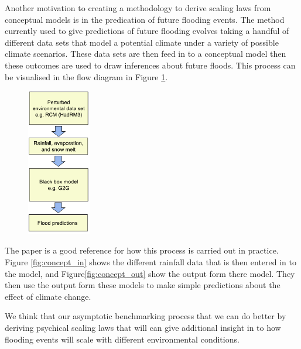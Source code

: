 \documentclass[11pt]{article}
\begin{document}
\begin{minipage}{0.35\textwidth}
    Another motivation to creating a methodology to derive scaling laws from conceptual models is in the predication of future flooding events. 
    The method currently used to give predictions of future flooding evolves taking a handful of different data sets that model a potential climate under a variety of possible climate scenarios. These data sets are then feed in to a conceptual model then these outcomes are used to draw inferences about future floods.
    This process can be visualised in the flow diagram in Figure \ref{fig:flow}.
\end{minipage}
\hspace{0.05\textwidth}
\begin{minipage}{0.55\textwidth}
    \begin{figure}[H]
    \centering
    \includegraphics[width=0.25\textwidth]{Figs/flow.png}
    \label{fig:flow}
\end{figure}
\end{minipage}

\vspace{5pt}

The paper \cite{BELL201289} is a good reference for how this process is carried out in practice. Figure \ref{fig:concept_in} shows the different rainfall data that is then entered in to the model, and Figure\ref{fig:concept_out} show the output form there model. They then use the output form these models to make simple predictions about the effect of climate change.

We think that our asymptotic benchmarking process that we can do better by deriving psychical scaling laws that will can give additional insight in to how flooding events will scale with different environmental conditions.
\end{document}
